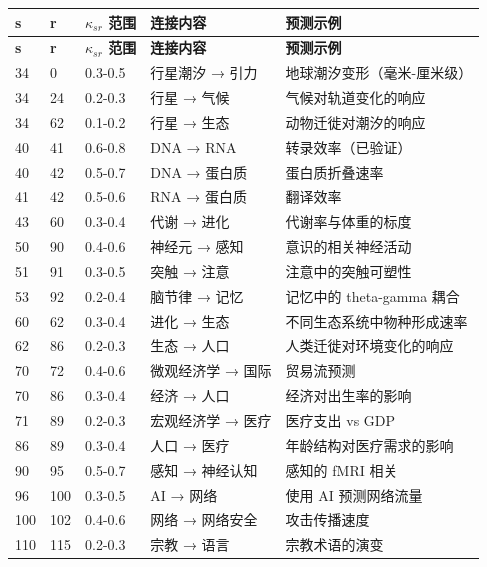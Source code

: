 \documentclass[11pt,a4paper]{article}
\begin{document}
	\begin{longtable}{|p{1cm}|p{1cm}|p{2.5cm}|p{4cm}|p{3cm}|}
		\hline
		\textbf{s} & \textbf{r} & \textbf{$\kappa_{sr}$ 范围} & \textbf{连接内容} & \textbf{预测示例} \\
		\hline
		\endfirsthead
		\hline
		\textbf{s} & \textbf{r} & \textbf{$\kappa_{sr}$ 范围} & \textbf{连接内容} & \textbf{预测示例} \\
		\hline
		\endhead
		34 & 0 & 0.3-0.5 & 行星潮汐 → 引力 & 地球潮汐变形（毫米-厘米级） \\
		34 & 24 & 0.2-0.3 & 行星 → 气候 & 气候对轨道变化的响应 \\
		34 & 62 & 0.1-0.2 & 行星 → 生态 & 动物迁徙对潮汐的响应 \\
		40 & 41 & 0.6-0.8 & DNA → RNA & 转录效率（已验证） \\
		40 & 42 & 0.5-0.7 & DNA → 蛋白质 & 蛋白质折叠速率 \\
		41 & 42 & 0.5-0.6 & RNA → 蛋白质 & 翻译效率 \\
		43 & 60 & 0.3-0.4 & 代谢 → 进化 & 代谢率与体重的标度 \\
		50 & 90 & 0.4-0.6 & 神经元 → 感知 & 意识的相关神经活动 \\
		51 & 91 & 0.3-0.5 & 突触 → 注意 & 注意中的突触可塑性 \\
		53 & 92 & 0.2-0.4 & 脑节律 → 记忆 & 记忆中的 theta-gamma 耦合 \\
		60 & 62 & 0.3-0.4 & 进化 → 生态 & 不同生态系统中物种形成速率 \\
		62 & 86 & 0.2-0.3 & 生态 → 人口 & 人类迁徙对环境变化的响应 \\
		70 & 72 & 0.4-0.6 & 微观经济学 → 国际 & 贸易流预测 \\
		70 & 86 & 0.3-0.4 & 经济 → 人口 & 经济对出生率的影响 \\
		71 & 89 & 0.2-0.3 & 宏观经济学 → 医疗 & 医疗支出 vs GDP \\
		86 & 89 & 0.3-0.4 & 人口 → 医疗 & 年龄结构对医疗需求的影响 \\
		90 & 95 & 0.5-0.7 & 感知 → 神经认知 & 感知的 fMRI 相关 \\
		96 & 100 & 0.3-0.5 & AI → 网络 & 使用 AI 预测网络流量 \\
		100 & 102 & 0.4-0.6 & 网络 → 网络安全 & 攻击传播速度 \\
		110 & 115 & 0.2-0.3 & 宗教 → 语言 & 宗教术语的演变 \\
		\hline
	\end{longtable}
	
\end{document}
